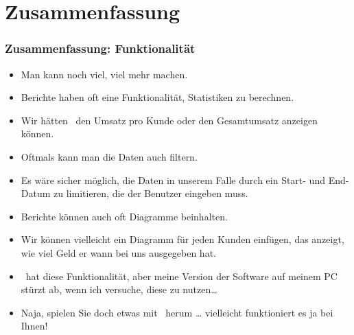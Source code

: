 \documentclass[aspectratio=169,mathserif,notheorems]{beamer}%
\begin{document}
\section{Zusammenfassung}%
%
\begin{frame}%
\frametitle{Zusammenfassung: Funktionalität}%
\begin{itemize}%
%
%
%
%
\item<3-> Man kann noch viel, viel mehr machen.%
%
\item<4-> Berichte haben oft eine Funktionalität, Statistiken zu berechnen.%
%
\item<5-> Wir hätten \DEzB\ den Umsatz pro Kunde oder den Gesamtumsatz anzeigen können.%
%
\item<6-> Oftmals kann man die Daten auch filtern.%
%
\item<7-> Es wäre sicher möglich, die Daten in unserem Falle durch ein Start- und End-Datum zu limitieren, die der Benutzer eingeben muss.%
%
\item<8-> Berichte können auch oft Diagramme beinhalten.%
%
\item<9-> Wir können vielleicht ein Diagramm für jeden Kunden einfügen, das anzeigt, wie viel Geld er wann bei uns ausgegeben hat.%
%
\item<10-> \libreofficeBase\ hat diese Funktionalität, aber meine Version der Software auf meinem PC stürzt ab, wenn ich versuche, diese zu nutzen\dots%
%
\item<11-> Naja, spielen Sie doch etwas mit \libreofficeBase\ herum {\dots} vielleicht funktioniert es ja bei Ihnen!%
%
\end{itemize}%
\end{frame}%
%
\end{document}
